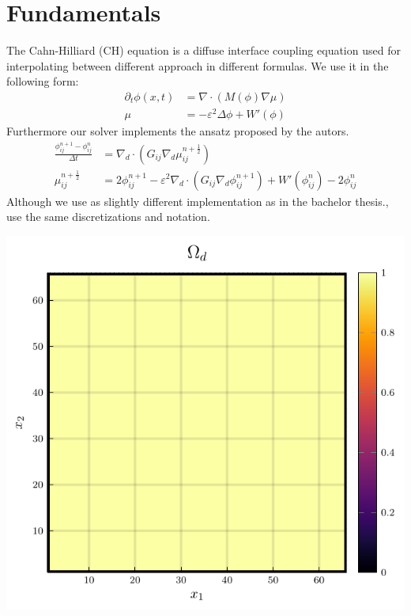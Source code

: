 \documentclass{mimosis}
\begin{document}
\chapter{Fundamentals}
\label{sec:orga3eaff8}
The Cahn-Hilliard (CH) equation is a diffuse interface coupling equation used for interpolating between different approach in different formulas. We use it in the following form:
\begin{equation}
\begin{aligned}
\partial_{t}\phi(x,t) &=  \nabla \cdot(M(\phi)\nabla\mu) \\
\mu &= - \varepsilon^2 \Delta\phi  + W'(\phi)
\end{aligned}
\end{equation}
Furthermore our solver implements the ansatz proposed by the autors\autocite{SHIN20117441}.
\begin{equation}
\label{eq:ansatz}
\begin{aligned}
\frac{\phi_{ij}^{n+1} - \phi_{ij}^n}{\Delta t}  &=  \nabla _d \cdot (G_{ij} \nabla_d \mu_{ij}^{n+\frac{1}{2}} )  \\
 \mu_{ij}^{n+\frac{1}{2}} &= 2\phi_{ij}^{n+1} - \varepsilon^2  \nabla_d \cdot  (G_{ij} \nabla _d \phi_{ij}^{n+1} ) + W'(\phi_{ij}^n) - 2\phi _{ij}^n
\end{aligned}
\end{equation}
Although we use as slightly different implementation as in the bachelor thesis\autocite{Ulmer_CHRelaxed_2024}.,  use the same discretizations and notation.

\begin{center}
\includegraphics[width=.9\linewidth]{images/domain.png}
\label{}
\end{center}
\end{document}

